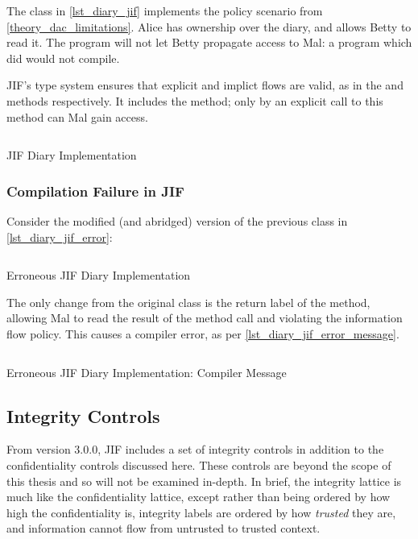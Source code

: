The class in \autoref{lst_diary_jif} implements the policy scenario from \ref{theory_dac_limitations}. Alice has ownership over the diary, and allows Betty to read it. The program will not let Betty propagate access to Mal: a program which did would not compile.

JIF's type system ensures that explicit and implict flows are valid, as in the  and  methods respectively. It includes the  method; only by an explicit call to this method can Mal gain access.

\begin{listing}[!ht]
	\inputminted{java}{content/code_sections/jif_para_bg/Diary.jif}
	\caption{JIF Diary Implementation}
	\label{lst_diary_jif}
\end{listing}

\clearpage

\subsubsection{Compilation Failure in JIF}

Consider the modified (and abridged) version of the previous class in \autoref{lst_diary_jif_error}:

\begin{listing}[!ht]
	\inputminted{java}{content/code_sections/jif_para_bg/DiaryError.jif}
	\caption{Erroneous JIF Diary Implementation}
	\label{lst_diary_jif_error}
\end{listing}

The only change from the original  class is the return label of the  method, allowing Mal to read the result of the method call and violating the information flow policy. This causes a compiler error, as per \autoref{lst_diary_jif_error_message}.

\begin{listing}[!ht]
	\inputminted[fontsize=\footnotesize]{text}{content/code_sections/jif_para_bg/DiaryError_message_jif.txt}
	\caption{Erroneous JIF Diary Implementation: Compiler Message}
	\label{lst_diary_jif_error_message}
\end{listing}

\clearpage

\subsection{Integrity Controls}

From version 3.0.0, JIF includes a set of integrity controls in addition to the confidentiality controls discussed here. These controls are beyond the scope of this thesis and so will not be examined in-depth. In brief, the integrity lattice is much like the confidentiality lattice, except rather than being ordered by how high the confidentiality is, integrity labels are ordered by how \textit{trusted} they are, and information cannot flow from untrusted to trusted context.

